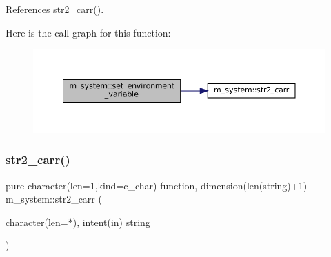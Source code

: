 References str2\+\_\+carr().

Here is the call graph for this function\+:\nopagebreak
\begin{figure}[H]
\begin{center}
\leavevmode
\includegraphics[width=350pt]{namespacem__system_ad813765403a5d9d6fb7a2edcb669fe4b_cgraph}
\end{center}
\end{figure}
\mbox{\label{namespacem__system_a58bb591b5b9fefec3960a28361aae07a}} 
\subsubsection{\texorpdfstring{str2\+\_\+carr()}{str2\_carr()}}
{\footnotesize\ttfamily pure character(len=1,kind=c\+\_\+char) function, dimension(len(string)+1) m\+\_\+system\+::str2\+\_\+carr (\begin{DoxyParamCaption}\item[{character(len=$\ast$), intent(in)}]{string }\end{DoxyParamCaption})\hspace{0.3cm}{\ttfamily [private]}}

